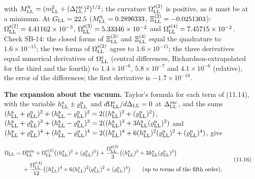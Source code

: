 \documentclass[
  10pt,
]{article}
\begin{document}
with
\(M^{\rm q}_{\rm LL}=(m_{\rm LL}^2+(\Delta^{\rm vac}_{\rm LL})^2)^{1/2}\);
the curvature \(\Omega^{\rm s(2)}_{\rm LL}\) is positive, as it must be
at a minimum. At \(G_{\rm LL}=22.5\) (\(M^{\rm q}_{\rm LL}=0.2896333\),
\(\Xi^{(2)}_{\rm LL}=-0.0251303\)):
\(\Omega^{\rm s(2)}_{\rm LL}=4.41162\times10^{-3}\),
\(\Omega^{\rm s(3)}_{\rm LL}=5.33346\times10^{-2}\) and
\(\Omega^{\rm s(4)}_{\rm LL}=7.45715\times10^{-2}\). Check SB-14: the
closed forms of \(\Xi^{(3)}_{\rm LL}\) and \(\Xi^{(4)}_{\rm LL}\) equal
the quadrature to \(1.6\times10^{-15}\); the two forms of
\(\Omega^{\rm s(2)}_{\rm LL}\) agree to \(1.6\times10^{-15}\); the three
derivatives equal numerical derivatives of \(\Omega^{\rm s}_{\rm LL}\)
(central differences, Richardson-extrapolated for the third and the
fourth) to \(1.4\times10^{-6}\), \(5.8\times10^{-7}\) and
\(4.1\times10^{-6}\) (relative), the error of the differences; the first
derivative is \(-1.7\times10^{-18}\).

\textbf{The expansion about the vacuum.} Taylor's formula for each term
of (11.14), with the variable
\(h^{\rm a}_{\rm LL}\pm\varrho^{\rm n}_{\rm LL}\) and
\(d\Omega^{\rm s}_{\rm LL}/d\Delta_{\rm LL}=0\) at
\(\Delta^{\rm vac}_{\rm LL}\), and the sums
\((h^{\rm a}_{\rm LL}+\varrho^{\rm n}_{\rm LL})^2+(h^{\rm a}_{\rm LL}-\varrho^{\rm n}_{\rm LL})^2=2((h^{\rm a}_{\rm LL})^2+(\varrho^{\rm n}_{\rm LL})^2)\),
\((h^{\rm a}_{\rm LL}+\varrho^{\rm n}_{\rm LL})^3+(h^{\rm a}_{\rm LL}-\varrho^{\rm n}_{\rm LL})^3=2((h^{\rm a}_{\rm LL})^3+3h^{\rm a}_{\rm LL}(\varrho^{\rm n}_{\rm LL})^2)\)
and
\((h^{\rm a}_{\rm LL}+\varrho^{\rm n}_{\rm LL})^4+(h^{\rm a}_{\rm LL}-\varrho^{\rm n}_{\rm LL})^4=2((h^{\rm a}_{\rm LL})^4+6(h^{\rm a}_{\rm LL})^2(\varrho^{\rm n}_{\rm LL})^2+(\varrho^{\rm n}_{\rm LL})^4)\),
give

\[\begin{aligned}\Omega_{\rm LL}={}&\Omega^{\rm min}_{\rm LL}+\Omega^{\rm s(2)}_{\rm LL}\big((h^{\rm a}_{\rm LL})^2+(\varrho^{\rm n}_{\rm LL})^2\big)+\frac{\Omega^{\rm s(3)}_{\rm LL}}3\big((h^{\rm a}_{\rm LL})^3+3h^{\rm a}_{\rm LL}(\varrho^{\rm n}_{\rm LL})^2\big)\\&+\frac{\Omega^{\rm s(4)}_{\rm LL}}{12}\big((h^{\rm a}_{\rm LL})^4+6(h^{\rm a}_{\rm LL})^2(\varrho^{\rm n}_{\rm LL})^2+(\varrho^{\rm n}_{\rm LL})^4\big)\qquad\text{(up to terms of the fifth order)},\end{aligned}\tag{11.16}\]
\end{document}
